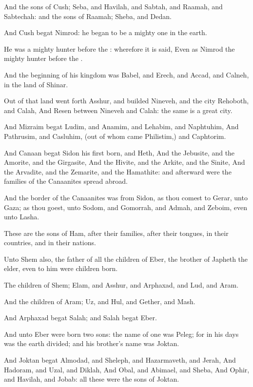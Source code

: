 \verse And the sons of Cush; Seba, and Havilah, and Sabtah, and Raamah,
and Sabtechah: and the sons of Raamah; Sheba, and Dedan.

\verse And Cush begat Nimrod: he began to be a mighty one in the earth.

\verse He was a mighty hunter before the \LORD: wherefore it is said,
Even as Nimrod the mighty hunter before the \LORD.

\verse And the beginning of his kingdom was Babel, and Erech, and
Accad, and Calneh, in the land of Shinar.

\verse Out of that land went forth Asshur, and builded Nineveh, and the
city Rehoboth, and Calah, \verse And Resen between Nineveh and Calah:
the same is a great city.

\verse And Mizraim begat Ludim, and Anamim, and Lehabim, and Naphtuhim,
\verse And Pathrusim, and Casluhim, (out of whom came Philistim,) and
Caphtorim.

\verse And Canaan begat Sidon his first born, and Heth, \verse And the
Jebusite, and the Amorite, and the Girgasite, \verse And the Hivite,
and the Arkite, and the Sinite, \verse And the Arvadite, and the
Zemarite, and the Hamathite: and afterward were the families of the
Canaanites spread abroad.

\verse And the border of the Canaanites was from Sidon, as thou comest
to Gerar, unto Gaza; as thou goest, unto Sodom, and Gomorrah, and
Admah, and Zeboim, even unto Lasha.

\verse These are the sons of Ham, after their families, after their
tongues, in their countries, and in their nations.

\verse Unto Shem also, the father of all the children of Eber, the
brother of Japheth the elder, even to him were children born.

\verse The children of Shem; Elam, and Asshur, and Arphaxad, and Lud,
and Aram.

\verse And the children of Aram; Uz, and Hul, and Gether, and Mash.

\verse And Arphaxad begat Salah; and Salah begat Eber.

\verse And unto Eber were born two sons: the name of one was Peleg; for
in his days was the earth divided; and his brother's name was Joktan.

\verse And Joktan begat Almodad, and Sheleph, and Hazarmaveth, and
Jerah, \verse And Hadoram, and Uzal, and Diklah, \verse And Obal, and
Abimael, and Sheba, \verse And Ophir, and Havilah, and Jobab: all these
were the sons of Joktan.


